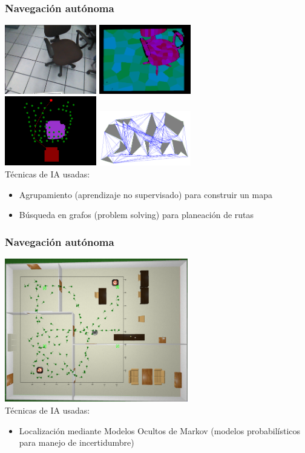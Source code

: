 \documentclass[10pt,spanish,aspectratio=1610]{beamer}
\begin{document}
\begin{frame}\frametitle{Navegación autónoma}
  \centering
  \includegraphics[width=0.3\textwidth]{Figures/VQ1.png}
  \includegraphics[width=0.3\textwidth]{Figures/VQ2.png}\\
  \includegraphics[width=0.3\textwidth]{Figures/VQ3.png}
  \includegraphics[width=0.3\textwidth]{Figures/VisibilityGraph.png}\\
  Técnicas de IA usadas:
  \begin{itemize}
  \item Agrupamiento (aprendizaje no supervisado) para construir un mapa
  \item Búsqueda en grafos (problem solving) para planeación de rutas
  \end{itemize}
\end{frame}

\begin{frame}\frametitle{Navegación autónoma}
  \centering
  \includegraphics[width=0.6\textwidth]{Figures/LocalizationHMM.png}\\
  Técnicas de IA usadas:
  \begin{itemize}
  \item Localización mediante Modelos Ocultos de Markov (modelos probabilísticos para manejo de incertidumbre)
  \end{itemize}
\end{frame}
\end{document}
